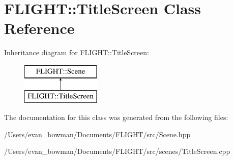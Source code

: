 \hypertarget{class_f_l_i_g_h_t_1_1_title_screen}{}\section{F\+L\+I\+G\+HT\+:\+:Title\+Screen Class Reference}
\label{class_f_l_i_g_h_t_1_1_title_screen}
Inheritance diagram for F\+L\+I\+G\+HT\+:\+:Title\+Screen\+:\begin{figure}[H]
\begin{center}
\leavevmode
\includegraphics[height=2.000000cm]{class_f_l_i_g_h_t_1_1_title_screen}
\end{center}
\end{figure}


The documentation for this class was generated from the following files\+:\begin{DoxyCompactItemize}
\item 
/\+Users/evan\+\_\+bowman/\+Documents/\+F\+L\+I\+G\+H\+T/src/Scene.\+hpp\item 
/\+Users/evan\+\_\+bowman/\+Documents/\+F\+L\+I\+G\+H\+T/src/scenes/Title\+Screen.\+cpp\end{DoxyCompactItemize}
